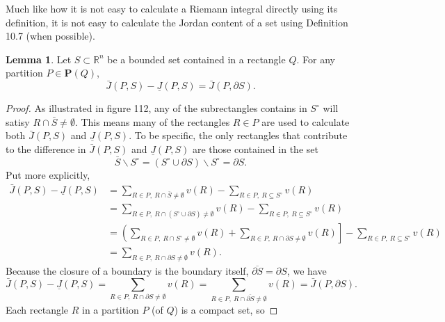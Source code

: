 \documentclass{article}
\newcommand{\R}{\mathbb{R}}
\theoremstyle{definition}
\newtheorem{lemma}{Lemma}[section]
\begin{document}
	Much like how it is not easy to calculate a Riemann integral directly using its definition, it is not easy to calculate the Jordan content of a set using Definition 10.7  (when possible).  
	\begin{lemma}
			Let $S\subset \R^n$ be a bounded set contained in a rectangle $Q$. For any partition $P\in \mathbf P(Q)$, 
			$$ \bar J(P,S) - \underline J(P,S) = \bar J(P,\partial S). $$
	\end{lemma}
\begin{proof}
	As illustrated in figure 112, any of the subrectangles contains in $S^\circ$ will satisy $R\cap \bar S\neq \emptyset$. This means many of the rectangles $R\in P$ are used to calculate both $\bar J(P,S)$ and $ \underline J(P,S)$. To be specific, the only rectangles that contribute to the difference in $\bar J(P,S)$  and $ \underline J(P,S)$ are those contained in the set 
	$$ \bar S\backslash S^\circ = (S^\circ \cup \partial S) \backslash S^\circ = \partial S.$$
	Put more explicitly, 
	\begin{align*}
		\bar J(P,S) - \underline J(P,S) & = \sum_{R\in P,\ R\cap \bar S\neq \emptyset}v(R) - \sum_{R\in P,\ R\subseteq S^\circ} v(R)		\\
		& = \sum_{R\in P,\ R\cap (S^\circ \cup \partial S) \neq \emptyset}v(R) - \sum_{R\in P,\ R\subseteq S^\circ} v(R)	\\
		& =  \left(\sum_{R\in P,\ R\cap   S^\circ \neq \emptyset}v(R) + \sum_{R\in P,\ R\cap  \partial S \neq \emptyset}v(R)\right]  - \sum_{R\in P,\ R\subseteq S^\circ} v(R)	\\
		& = \sum_{R\in P,\ R\cap  \partial S \neq \emptyset}v(R).
	\end{align*}
Because the closure of a boundary is the boundary itself, $\overline{\partial S} = \partial S$, we have 
$$	\bar J(P,S) - \underline J(P,S) = \sum_{R\in P,\ R\cap  \partial S \neq \emptyset}v(R) = \sum_{R\in P,\ R\cap  \overline{\partial S} \neq \emptyset}v(R) = 	\bar J(P,\partial S) .$$ Each rectangle $R$ in a partition $P$ (of $Q$) is a compact set, so 
\end{proof}
\end{document}
